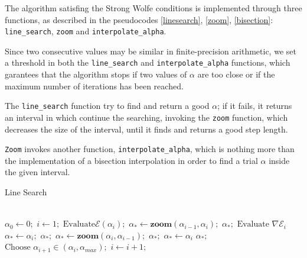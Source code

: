			The algorithm satisfing the Strong Wolfe conditions is implemented through three functions, as described in the pseudocodes \ref{linesearch}, \ref{zoom}, \ref{bisection}:  \texttt{line\_search}, \texttt{zoom} and \texttt{interpolate\_alpha}.

			Since two consecutive values may be similar in finite-precision arithmetic, we set a threshold in both the \texttt{line\_search} and  \texttt{interpolate\_alpha} functions, which garantees that the algorithm stops if two values of $\alpha$ are too close or if the maximum number of iterations has been reached.

			The \texttt{line\_search} function try to find and return a good $\alpha$; if it fails, it returns an interval in which continue the searching, invoking the \texttt{zoom} function, which decreases the size of the interval, until it finds and returns a good step length.

			\texttt{Zoom} invokes another function, \texttt{interpolate\_alpha}, which is nothing more than the implementation of a bisection interpolation in order to find a trial $\alpha$ inside the given interval. 



			\begin{algorithm}
			\caption{Line Search}\label{linesearch}
			\begin{algorithmic}[1]
			\\
			\State $\alpha_0 \gets \textit{0};$
			\State $i \gets \textit{1};$
			 		\State  $ \text{Evaluate}\mathcal{E}(\alpha_i);$
						\State $\alpha_* \gets \textbf{zoom}(\alpha_{i-1},\alpha_{i});$
						\Return $\alpha_*; $
					\EndIf
					\State   $\text{Evaluate } \nabla\mathcal{E}_{i} $
						\State $\alpha_* \gets \alpha_i; $
						\Return $\alpha_*; $
					\EndIf
						\State $\alpha_* \gets \textbf{zoom}(\alpha_{i},\alpha_{i-1}); $
						\Return $\alpha_*; $
					\EndIf
						\State $\alpha_* \gets\alpha_{i}$
						\Return $\alpha_*;$
					\EndIf
					\State $\text{Choose  } \alpha_{i+1}  \in (\alpha_i, \alpha_{max});$
					\State $i \gets i+1; $
			\EndWhile
			\EndProcedure
			\end{algorithmic}
			\end{algorithm}



